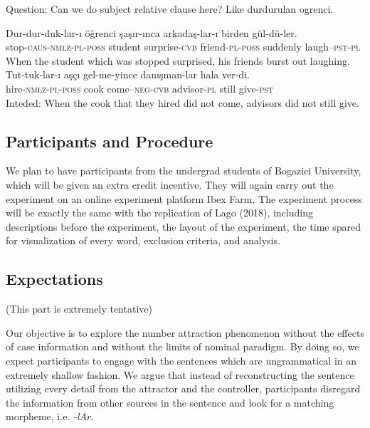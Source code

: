 \documentclass[11pt,a4paper]{article}
\begin{document}
Question: Can we do subject relative clause here? Like durdurulan
ogrenci.

\begin{exe}
\ex
\begin{xlist}
\ex \label{fillerreg1}
\gll Dur-dur-duk-lar-{\i} \"{o}\u{g}renci \c{s}a\c{s}{\i}r-{\i}nca arkada\c{s}-lar-{\i} birden g\"{u}l-d\"{u}-ler.\\
stop-\textsc{caus}-\textsc{nmlz}-\textsc{pl}-\textsc{poss} student surprise-\textsc{cvb} friend-\textsc{pl}-\textsc{poss} suddenly laugh--\textsc{pst}-\textsc{pl}\\
\glt When the student which was stopped surprised, his friends burst out laughing.
\ex \label{fillerreg2}
\gll *Tut-tuk-lar-{\i} a\c{s}\c{c}{\i} gel-me-yince dan{\i}\c{s}man-lar hala ver-di.\\
hire-\textsc{nmlz}-\textsc{pl}-\textsc{poss} cook come--\textsc{neg}-\textsc{cvb} advisor-\textsc{pl} still give-\textsc{pst}\\
\glt Inteded: When the cook that they hired did not come, advisors did not still give. 
\end{xlist}
\end{exe}

\subsection{Participants and
Procedure}\label{participants-and-procedure-1}

We plan to have participants from the undergrad students of Bogazici
University, which will be given an extra credit incentive. They will
again carry out the experiment on an online experiment platform Ibex
Farm. The experiment process will be exactly the same with the
replication of Lago (2018), including descriptions before the
experiment, the layout of the experiment, the time spared for
visualization of every word, exclusion criteria, and analysis.

\subsection{Expectations}\label{expectations}

(This part is extremely tentative)

Our objective is to explore the number attraction phenomenon without the
effects of case information and without the limits of nominal paradigm.
By doing so, we expect participants to engage with the sentences which
are ungrammatical in an extremely shallow fashion. We argue that instead
of reconstructing the sentence utilizing every detail from the attractor
and the controller, participants disregard the information from other
sources in the sentence and look for a matching morpheme, i.e.
\emph{-lAr}.
\end{document}
